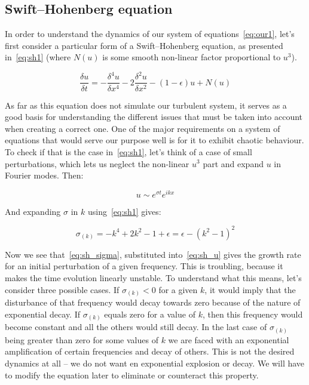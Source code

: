 \documentclass[11pt,a4paper]{article}
\begin{document}
\subsection{Swift--Hohenberg equation}
In order to understand the dynamics of our system of equations~\eqref{eq:our1}, let's first consider a particular form of a Swift--Hohenberg\cite{Hohenberg74} equation, as presented in~\eqref{eq:sh1} (where $N(u)$ is some smooth non-linear factor proportional to $u^3$).

\begin{equation}\label{eq:sh1}
\frac{\delta u}{\delta t} = -\frac{\delta^4u}{\delta x^4} - 2\frac{\delta^2u}{\delta x^2} - (1 - \epsilon )u + N(u)
\end{equation}

As far as this equation does not simulate our turbulent system, it serves as a good basis for understanding the different issues that must be taken into account when creating a correct one.
One of the major requirements on a system of equations that would serve our purpose well is for it to exhibit chaotic behaviour.
To check if that is the case in~\eqref{eq:sh1}, let's think of a case of small perturbations, which lets us neglect the non-linear $u^3$ part and expand $u$ in Fourier modes. Then:

\begin{equation}\label{eq:sh_u}
    u \sim e^{\sigma t}e^{ikx}
\end{equation}

And expanding $\sigma$ in $k$ using~\eqref{eq:sh1} gives:

\begin{equation}\label{eq:sh_sigma}
    \sigma_{(k)} = -k^4 + 2k^2 - 1 + \epsilon = \epsilon - (k^2 - 1)^2
\end{equation}

Now we see that~\eqref{eq:sh_sigma}, substituted into~\eqref{eq:sh_u} gives the growth rate for an initial perturbation of a given frequency.
This is troubling, because it makes the time evolution linearly unstable.
To understand what this means, let's consider three possible cases.
If $\sigma_{(k)} < 0$ for a given $k$, it would imply that the disturbance of that frequency would decay towards zero because of the nature of exponential decay.
If $\sigma_{(k)}$ equals zero for a value of $k$, then this frequency would become constant and all the others would still decay.
In the last case of $\sigma_{(k)}$ being greater than zero for some values of $k$ we are faced with an exponential amplification of certain frequencies and decay of others.
This is not the desired dynamics at all -- we do not want en exponential explosion or decay.
We will have to modify the equation later to eliminate or counteract this property.
\end{document}
